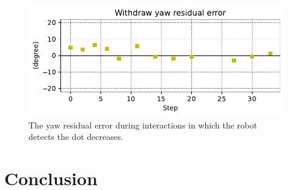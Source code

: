 \documentclass[runningheads]{llncs}
\begin{document}
\begin{figure}
	\includegraphics[width=\textwidth]{03_yaw_re.pdf}
	\caption{The yaw residual error during interactions in which the robot detects the dot decreases.} \label{fig:yaw_re}
\end{figure}

\section{Conclusion}


\begin{credits}


\end{credits}
%
%
%


%
\end{document}

